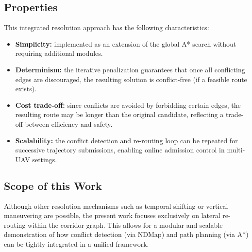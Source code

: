 \subsection*{Properties}
This integrated resolution approach has the following characteristics:
\begin{itemize}
    \item \textbf{Simplicity:} implemented as an extension of the global A* search without requiring additional modules.
    \item \textbf{Determinism:} the iterative penalization guarantees that once all conflicting edges are discouraged, 
    the resulting solution is conflict-free (if a feasible route exists).
    \item \textbf{Cost trade-off:} since conflicts are avoided by forbidding certain edges, 
    the resulting route may be longer than the original candidate, reflecting a trade-off between efficiency and safety.
    \item \textbf{Scalability:} the conflict detection and re-routing loop can be repeated for successive trajectory submissions, 
    enabling online admission control in multi-UAV settings.
\end{itemize}

\subsection*{Scope of this Work}
Although other resolution mechanisms such as temporal shifting or vertical maneuvering 
are possible, the present work focuses exclusively on lateral re-routing within the 
corridor graph. This allows for a modular and scalable demonstration of how conflict 
detection (via NDMap) and path planning (via A*) can be tightly integrated in a unified framework.

